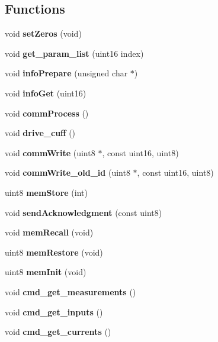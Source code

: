 \subsection*{Functions}
\begin{DoxyCompactItemize}
\item 
\mbox{\label{command__processing_8h_abb781ac00e0752ce772a75f7b5d1a5b7}} 
void {\bfseries set\+Zeros} (void)
\item 
\mbox{\label{command__processing_8h_a5ef086c932682ca5f7549b74ead732aa}} 
void {\bfseries get\+\_\+param\+\_\+list} (uint16 index)
\item 
\mbox{\label{command__processing_8h_a6fda7bc0be24d261f9cb09e77616b1be}} 
void {\bfseries info\+Prepare} (unsigned char $\ast$)
\item 
\mbox{\label{command__processing_8h_a813734e69ea461791f84bddee422013f}} 
void {\bfseries info\+Get} (uint16)
\item 
\mbox{\label{command__processing_8h_a2e5d1711e19837adc3e8f479af3ae509}} 
void {\bfseries comm\+Process} ()
\item 
\mbox{\label{command__processing_8h_a8d9f34c84c2a23fa548a5266aa8227a6}} 
void {\bfseries drive\+\_\+cuff} ()
\item 
\mbox{\label{command__processing_8h_af59b7a35df04af1df698749a771890eb}} 
void {\bfseries comm\+Write} (uint8 $\ast$, const uint16, uint8)
\item 
\mbox{\label{command__processing_8h_af454a3663070706183ebf8f1ba784343}} 
void {\bfseries comm\+Write\+\_\+old\+\_\+id} (uint8 $\ast$, const uint16, uint8)
\item 
uint8 \textbf{ mem\+Store} (int)
\item 
\mbox{\label{command__processing_8h_afe5c87f9df9bb965976b5d40c4159f1f}} 
void {\bfseries send\+Acknowledgment} (const uint8)
\item 
void \textbf{ mem\+Recall} (void)
\item 
uint8 \textbf{ mem\+Restore} (void)
\item 
uint8 \textbf{ mem\+Init} (void)
\item 
void \textbf{ cmd\+\_\+get\+\_\+measurements} ()
\item 
\mbox{\label{command__processing_8h_a20db4694e8caa572ec479f73ce8b3b02}} 
void {\bfseries cmd\+\_\+get\+\_\+inputs} ()
\item 
\mbox{\label{command__processing_8h_aaf613e251c1e14fe4fffe3e9e033f9f7}} 
void {\bfseries cmd\+\_\+get\+\_\+currents} ()
\item 
\mbox{\label{command__processing_8h_a45a90a8455bfdb6a7f0e118da2c6f0a6}} 

\end{DoxyCompactItemize}
